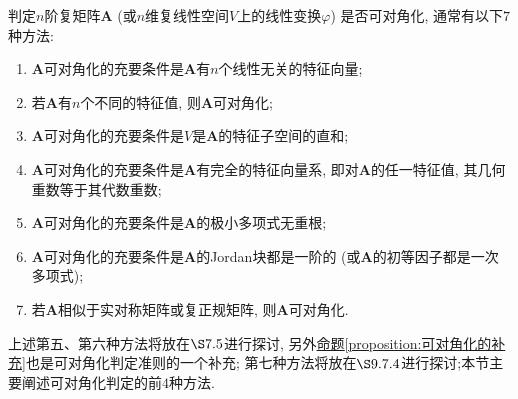 \documentclass[../../main.tex]{subfiles}%
\begin{document}
\begin{theorem}[可对角化的判定条件]\label{theorem:可对角化的判定条件}
判定\(n\)阶复矩阵\(\boldsymbol{A}\) (或\(n\)维复线性空间\(V\)上的线性变换\(\varphi\)) 是否可对角化, 通常有以下\(7\)种方法:
\begin{enumerate}[(1)]
\item  \(\boldsymbol{A}\)可对角化的充要条件是\(\boldsymbol{A}\)有\(n\)个线性无关的特征向量;

\item 若\(\boldsymbol{A}\)有\(n\)个不同的特征值, 则\(\boldsymbol{A}\)可对角化;

\item \(\boldsymbol{A}\)可对角化的充要条件是\(V\)是\(\boldsymbol{A}\)的特征子空间的直和;

\item \(\boldsymbol{A}\)可对角化的充要条件是\(\boldsymbol{A}\)有完全的特征向量系, 即对\(\boldsymbol{A}\)的任一特征值, 其几何重数等于其代数重数;

\item \(\boldsymbol{A}\)可对角化的充要条件是\(\boldsymbol{A}\)的极小多项式无重根;

\item \(\boldsymbol{A}\)可对角化的充要条件是\(\boldsymbol{A}\)的Jordan块都是一阶的 (或\(\boldsymbol{A}\)的初等因子都是一次多项式);

\item 若\(\boldsymbol{A}\)相似于实对称矩阵或复正规矩阵, 则\(\boldsymbol{A}\)可对角化.
\end{enumerate}
\end{theorem}
\begin{remark}
上述第五、第六种方法将放在\(\S7.5\)进行探讨, 另外\hyperref[proposition:可对角化的补充]{命题\ref{proposition:可对角化的补充}}也是可对角化判定准则的一个补充; 第七种方法将放在\(\S9.7.4\)进行探讨;本节主要阐述可对角化判定的前\(4\)种方法.
\end{remark}
\end{document}
